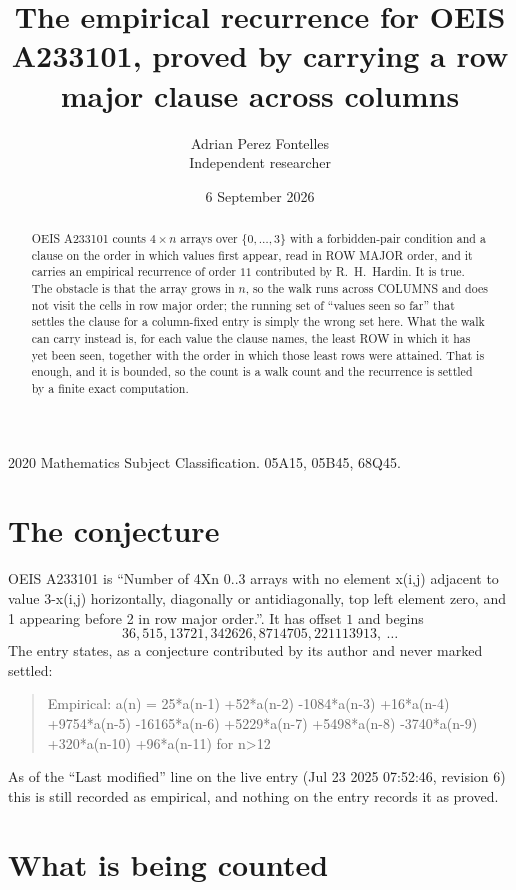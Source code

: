 \documentclass[11pt,a4paper]{article}
\title{The empirical recurrence for OEIS A233101, proved by carrying a row major clause across
columns}
\author{Adrian Perez Fontelles\\ \small Independent researcher}
\date{6 September 2026}
\theoremstyle{plain}
\theoremstyle{definition}
\begin{document}
\maketitle

\begin{abstract}
OEIS A233101 counts $4\times n$ arrays over $\{0,\dots,3\}$ with a forbidden-pair
condition and a clause on the order in which values first appear, read in ROW MAJOR order, and
it carries an empirical recurrence of order $11$ contributed by R.~H.~Hardin. It is true.
The obstacle is that the array grows in $n$, so the walk runs across COLUMNS and does not visit
the cells in row major order; the running set of ``values seen so far'' that settles the clause
for a column-fixed entry is simply the wrong set here. What the walk can carry instead is, for
each value the clause names, the least ROW in which it has yet been seen, together with the
order in which those least rows were attained. That is enough, and it is bounded, so the count
is a walk count and the recurrence is settled by a finite exact computation.
\end{abstract}

\noindent\small 2020 Mathematics Subject Classification. 05A15, 05B45, 68Q45.\normalsize

\section{The conjecture}

OEIS A233101 is ``Number of 4Xn 0..3 arrays with no element x(i,j) adjacent to value 3-x(i,j) horizontally, diagonally or antidiagonally, top left element zero, and 1 appearing before 2 in row major order.''. It has offset $1$ and begins
\[
36, 515, 13721, 342626, 8714705, 221113913,\ \dots
\]
The entry states, as a conjecture contributed by its author and never marked settled:
\begin{quote}
Empirical: a(n) = 25*a(n-1) +52*a(n-2) -1084*a(n-3) +16*a(n-4) +9754*a(n-5) -16165*a(n-6) +5229*a(n-7) +5498*a(n-8) -3740*a(n-9) +320*a(n-10) +96*a(n-11) for n>12
\end{quote}
As of the ``Last modified'' line on the live entry (Jul 23 2025 07:52:46, revision 6) this is still
recorded as empirical, and nothing on the entry records it as proved.

\section{What is being counted}
\end{document}
